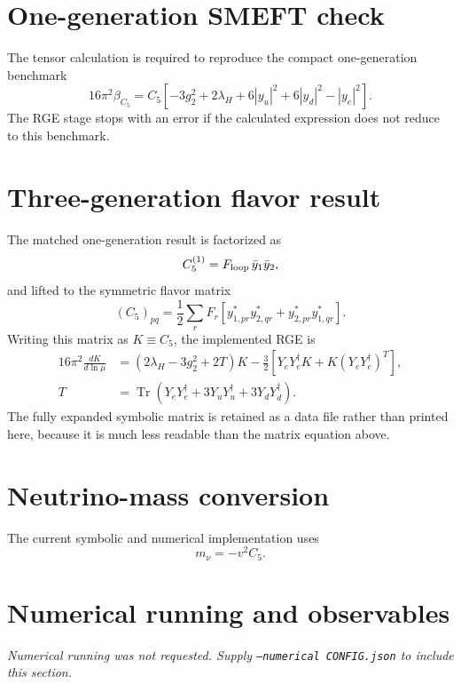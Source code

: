 \documentclass[10pt]{article}
\begin{document}
\section{One-generation SMEFT check}
The tensor calculation is required to reproduce the compact one-generation benchmark
\begin{equation}
16\pi^2\beta_{C_5}=C_5\left[
-3g_2^2+2\lambda_H+6|y_u|^2+6|y_d|^2-|y_e|^2
\right].
\end{equation}
The RGE stage stops with an error if the calculated expression does not reduce to this benchmark.
\section{Three-generation flavor result}
The matched one-generation result is factorized as
\begin{equation*}
C_5^{(1)}=F_{\rm loop}\,\bar y_1\bar y_2,
\end{equation*}
and lifted to the symmetric flavor matrix
\begin{equation}
(C_5)_{pq}=\frac12\sum_r F_r\left[
y_{1,pr}^*y_{2,qr}^*+y_{2,pr}^*y_{1,qr}^*
\right].
\end{equation}
Writing this matrix as $K\equiv C_5$, the implemented RGE is
\begin{align}
16\pi^2\frac{dK}{d\ln\mu}
&=(2\lambda_H-3g_2^2+2T)K
-\frac32\left[Y_eY_e^\dagger K+K(Y_eY_e^\dagger)^T\right],\\
T&=\operatorname{Tr}\!\left(
Y_eY_e^\dagger+3Y_uY_u^\dagger+3Y_dY_d^\dagger
\right).
\end{align}
The fully expanded symbolic matrix is retained as a data file rather than printed here, because it is much less readable than the matrix equation above.
\section{Neutrino-mass conversion}
The current symbolic and numerical implementation uses
\begin{equation}
m_\nu=-v^2C_5.
\end{equation}
\section{Numerical running and observables}
\textit{Numerical running was not requested. Supply \texttt{--numerical CONFIG.json} to include this section.}
\end{document}
